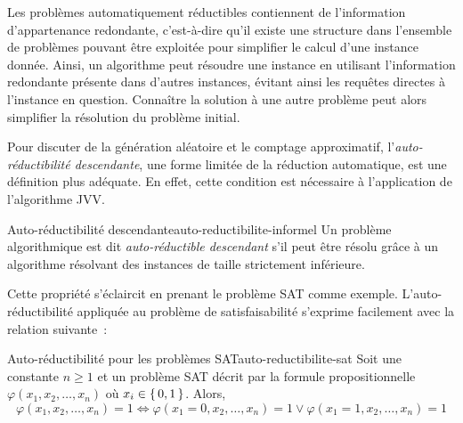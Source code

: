 Les problèmes automatiquement réductibles contiennent de l'information d'appartenance redondante, c'est-à-dire qu'il existe une structure dans l'ensemble de problèmes pouvant être exploitée pour simplifier le calcul d'une instance donnée. Ainsi, un algorithme peut résoudre une instance en utilisant l'information redondante présente dans d'autres instances, évitant ainsi les requêtes directes à l'instance en question. Connaître la solution à une autre problème peut alors simplifier la résolution du problème initial. 

Pour discuter de la génération aléatoire et le comptage approximatif, l'\textit{auto-réductibilité descendante}, une forme limitée de la réduction automatique, est une définition plus adéquate. En effet, cette condition est nécessaire à l'application de l'algorithme JVV.

\begin{maindefinition}{Auto-réductibilité descendante}{auto-reductibilite-informel}
    Un problème algorithmique est dit \textit{auto-réductible descendant} s'il peut être résolu grâce à un algorithme résolvant des instances de taille strictement inférieure.
\end{maindefinition}

Cette propriété s'éclaircit en prenant le problème SAT comme exemple. L'auto-réductibilité appliquée au problème de satisfaisabilité s'exprime facilement avec la relation suivante~\cite{hemaspaandraPowerSelfReducibilitySelectivity2020}:

\begin{relation}{Auto-réductibilité pour les problèmes SAT}{auto-reductibilite-sat}
    Soit une constante $n \geq 1$ et un problème SAT décrit par la formule propositionnelle $\varphi(x_{1}, x_{2}, \dots, x_{n})$ où $x_{i} \in \set{ 0, 1 }$. Alors,
    \begin{equation*}
        \varphi(x_{1}, x_{2}, \dots, x_{n}) = 1 \iff \varphi(x_{1}=0, x_{2}, \dots, x_{n}) = 1 \lor \varphi(x_{1}=1, x_{2}, \dots, x_{n}) = 1
    \end{equation*}
\end{relation}

